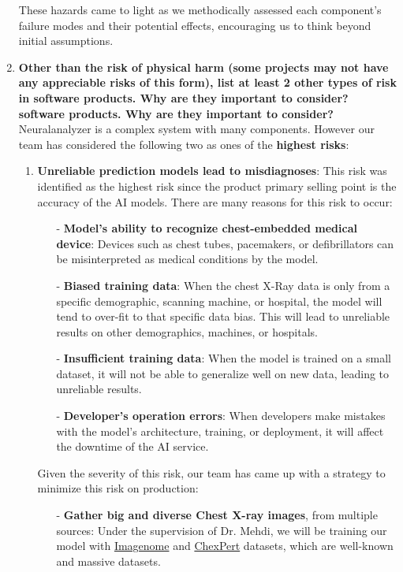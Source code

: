 \documentclass{article}
\begin{document}
\begin{enumerate}
    These hazards came to light as we methodically assessed each component's failure modes and their potential effects, encouraging us to think beyond initial assumptions.
    \item \textbf{Other than the risk of physical harm (some projects may not have any
    appreciable risks of this form), list at least 2 other types of risk in
    software products. Why are they important to consider?
    software products. Why are they important to consider?}
    Neuralanalyzer is a complex system with many components. However our team has considered the following two as ones of the \textbf{highest risks}:
    \begin{enumerate}
        \item \textbf{Unreliable prediction models lead to misdiagnoses}: This risk was identified as the highest risk since the product primary selling point is the accuracy of the AI models. There are many reasons for this risk to occur:
        \begin{itemize}
            \item[-] \textbf{Model's ability to recognize chest-embedded medical device}: Devices such as chest tubes, pacemakers, or defibrillators can be misinterpreted as medical conditions by the model.
            \item[-] \textbf{Biased training data}: When the chest X-Ray data is only from a specific demographic, scanning machine, or hospital, the model will tend to over-fit to that specific data bias. This will lead to unreliable results on other demographics, machines, or hospitals.
            \item[-] \textbf{Insufficient training data}: When the model is trained on a small dataset, it will not be able to generalize well on new data, leading to unreliable results.
            \item[-] \textbf{Developer's operation errors}: When developers make mistakes with the model's architecture, training, or deployment, it will affect the downtime of the AI service.
        \end{itemize}
        Given the severity of this risk, our team has came up with a strategy to minimize this risk on production:
        \begin{itemize}
            \item[-] \textbf{Gather big and diverse Chest X-ray images}, from multiple sources: Under the supervision of Dr. Mehdi, we will be training our model with \href{https://physionet.org/content/chest-imagenome/1.0.0/}{Imagenome} and \href{https://stanfordmlgroup.github.io/competitions/chexpert/}{ChexPert} datasets, which are well-known and massive datasets.

\end{itemize}
\end{enumerate}
\end{enumerate}
\end{document}
